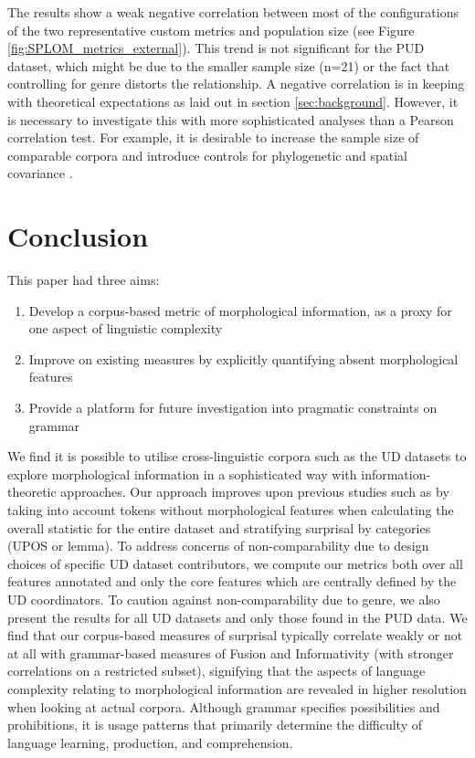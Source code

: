 \documentclass[USenglish]{article}
\begin{document}
The results show a weak negative correlation between most of the configurations of the two representative custom metrics and population size (see Figure \ref{fig:SPLOM_metrics_external}). 
This trend is not significant for the PUD dataset, which might be due to the smaller sample size (n=21) or the fact that controlling for genre distorts the relationship.
A negative correlation is in keeping with theoretical expectations as laid out in section \ref{sec:background}. 
However, it is necessary to investigate this with more sophisticated analyses than a Pearson correlation test.
For example, it is desirable to increase the sample size of comparable corpora and introduce controls for phylogenetic and spatial covariance \citep{shcherbakova2023societies}.

\section{Conclusion}
This paper had three aims:

\begin{enumerate}
    \item Develop a corpus-based metric of morphological information, as a proxy for one aspect of linguistic complexity
    \item Improve on existing measures by explicitly quantifying absent morphological features
    \item Provide a platform for future investigation into pragmatic constraints on grammar
\end{enumerate}

We find it is possible to utilise cross-linguistic corpora such as the UD datasets to explore morphological information in a sophisticated way with information-theoretic approaches. 
Our approach improves upon previous studies such as \citet{ccoltekin2023complexity} by taking into account tokens without morphological features when calculating the overall statistic for the entire dataset and stratifying surprisal by categories (UPOS or lemma). 
To address concerns of non-comparability due to design choices of specific UD dataset contributors, we compute our metrics both over all features annotated and only the core features which are centrally defined by the UD coordinators. 
To caution against non-comparability due to genre, we also present the results for all UD datasets and only those found in the PUD data. 
We find that our corpus-based measures of surprisal typically correlate weakly or not at all with grammar-based measures of Fusion and Informativity (with stronger correlations on a restricted subset), signifying that the aspects of language complexity relating to morphological information are revealed in higher resolution when looking at actual corpora.
Although grammar specifies possibilities and prohibitions, it is usage patterns that primarily determine the difficulty of language learning, production, and comprehension.
\end{document}
